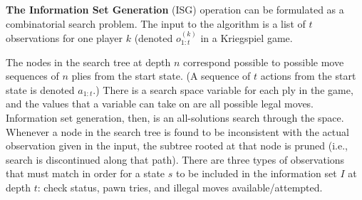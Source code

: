 \documentclass[10pt, conference, compsocconf]{IEEEtran}
\begin{document}

   
\textbf{The Information Set Generation}
(ISG) operation can be formulated as a combinatorial search problem.  The input to the algorithm is a list
of $t$ observations for one player $k$ (denoted $o_{1:t}^{(k)}$ in a Kriegspiel game.    

The nodes in the search tree at depth $n$ correspond possible to possible move 
sequences of $n$ plies from the start state.  (A sequence of $t$ actions from
the start state is denoted $a_{1:t}$.) There is a search space variable for
each ply in the game, and the values that a variable can take on are all
possible legal moves.  Information set generation, then, is an all-solutions
search through the space.  Whenever a node in the search tree is found to be
inconsistent with the actual observation given in the input, the subtree rooted
at that node is pruned (i.e., search is discontinued along that path).  There
are three types of observations that must match in order for a state $s$ to be
included in the information set $I$ at depth $t$: check status, pawn tries, and
illegal moves available/attempted.
\end{document}
